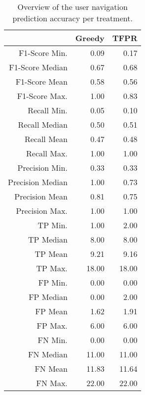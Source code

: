\begin{table}[ht]
\centering
\begin{tabular}{rrr}
  \hline
 & Greedy & TFPR \\ 
  \hline
F1-Score Min. & 0.09 & 0.17 \\ 
  F1-Score Median & 0.67 & 0.68 \\ 
  F1-Score Mean & 0.58 & 0.56 \\ 
  F1-Score Max. & 1.00 & 0.83 \\ 
  Recall Min. & 0.05 & 0.10 \\ 
  Recall Median & 0.50 & 0.51 \\ 
  Recall Mean & 0.47 & 0.48 \\ 
  Recall Max. & 1.00 & 1.00 \\ 
  Precision Min. & 0.33 & 0.33 \\ 
  Precision Median & 1.00 & 0.73 \\ 
  Precision Mean & 0.81 & 0.75 \\ 
  Precision Max. & 1.00 & 1.00 \\ 
  TP Min. & 1.00 & 2.00 \\ 
  TP Median & 8.00 & 8.00 \\ 
  TP Mean & 9.21 & 9.16 \\ 
  TP Max. & 18.00 & 18.00 \\ 
  FP Min. & 0.00 & 0.00 \\ 
  FP Median & 0.00 & 2.00 \\ 
  FP Mean & 1.62 & 1.91 \\ 
  FP Max. & 6.00 & 6.00 \\ 
  FN Min. & 0.00 & 0.00 \\ 
  FN Median & 11.00 & 11.00 \\ 
  FN Mean & 11.83 & 11.64 \\ 
  FN Max. & 22.00 & 22.00 \\ 
   \hline
\end{tabular}
\caption{Overview of the user navigation prediction accuracy per treatment.} 
\label{tab:results:rq4:summary:treatment}
\end{table}
